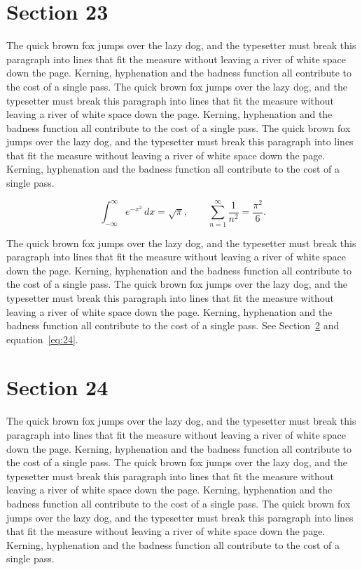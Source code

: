 \documentclass{article}
\begin{document}
\section{Section 23}
\label{sec:23}
The quick brown fox jumps over the lazy dog, and the typesetter must break this paragraph into lines that fit the measure without leaving a river of white space down the page. Kerning, hyphenation and the badness function all contribute to the cost of a single pass. The quick brown fox jumps over the lazy dog, and the typesetter must break this paragraph into lines that fit the measure without leaving a river of white space down the page. Kerning, hyphenation and the badness function all contribute to the cost of a single pass. The quick brown fox jumps over the lazy dog, and the typesetter must break this paragraph into lines that fit the measure without leaving a river of white space down the page. Kerning, hyphenation and the badness function all contribute to the cost of a single pass. 

\begin{equation}\label{eq:23}
\int_{-\infty}^{\infty} e^{-x^{2}}\,dx = \sqrt{\pi}, \qquad
\sum_{n=1}^{\infty} \frac{1}{n^{2}} = \frac{\pi^{2}}{6}.
\end{equation}

The quick brown fox jumps over the lazy dog, and the typesetter must break this paragraph into lines that fit the measure without leaving a river of white space down the page. Kerning, hyphenation and the badness function all contribute to the cost of a single pass. The quick brown fox jumps over the lazy dog, and the typesetter must break this paragraph into lines that fit the measure without leaving a river of white space down the page. Kerning, hyphenation and the badness function all contribute to the cost of a single pass. 
See Section~\ref{sec:24} and equation~\eqref{eq:24}.
\section{Section 24}
\label{sec:24}
The quick brown fox jumps over the lazy dog, and the typesetter must break this paragraph into lines that fit the measure without leaving a river of white space down the page. Kerning, hyphenation and the badness function all contribute to the cost of a single pass. The quick brown fox jumps over the lazy dog, and the typesetter must break this paragraph into lines that fit the measure without leaving a river of white space down the page. Kerning, hyphenation and the badness function all contribute to the cost of a single pass. The quick brown fox jumps over the lazy dog, and the typesetter must break this paragraph into lines that fit the measure without leaving a river of white space down the page. Kerning, hyphenation and the badness function all contribute to the cost of a single pass. 
\end{document}
